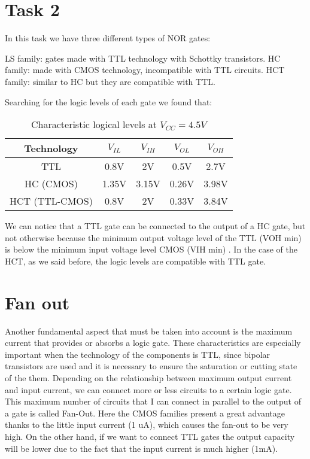 \newpage
\section*{Task 2}

    In this task we have three different types of NOR gates:

LS family: gates made with TTL technology with Schottky transistors.
HC family: made with CMOS technology, incompatible with TTL circuits.
HCT family: similar to HC but they are compatible with TTL.

Searching for the logic levels of each gate we found that:

\begin{table}[H]
    \begin{center}
        \begin{tabular}{|c||c|c|c|c|}
            \hline 
            Technology & $V_{IL}$ & $V_{IH}$ & $V_{OL}$ & $V_{OH}$\tabularnewline
            \hline 
            \hline 
            TTL & 0.8V & 2V & 0.5V & 2.7V\tabularnewline
            \hline 
            HC (CMOS) & 1.35V & 3.15V & 0.26V & 3.98V\tabularnewline
            \hline 
            HCT (TTL-CMOS) & 0.8V & 2V & 0.33V & 3.84V\tabularnewline
            \hline 
            \end{tabular}
    \caption{Characteristic logical levels at $V_{CC}=4.5V$}
    \end{center}
\end{table}
We can notice that a TTL gate can be connected to the output of a HC gate, but not  otherwise because the minimum output voltage level of the TTL (VOH min) is below the minimum input voltage level CMOS (VIH min) .
In the case of the HCT, as we said before, the logic levels are compatible with TTL gate. 

\section*{Fan out}

Another fundamental aspect that must be taken into account is the maximum current that
provides or absorbs a logic gate. These characteristics are especially
important when the technology of the components is TTL, since bipolar transistors are used and it is necessary to ensure the saturation or cutting state of the
them. Depending on the relationship between maximum output current and
input current, we can connect more or less circuits to a certain logic gate. This maximum number of circuits that I can connect in parallel to the output of a gate is called Fan-Out.
Here the CMOS families present a great advantage thanks to the little
input current (1 uA), which causes the fan-out to be very high. 
On the other hand, if we want to connect TTL gates 
the output capacity will be lower due to the fact that the input current is much higher (1mA).

